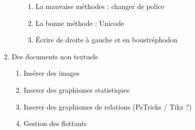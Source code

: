 \begin{enumerate}
\begin{enumerate}
\begin{enumerate}
		\begin{enumerate}
			\item La mauvaise méthodes : changer de police
			\item La bonne méthode : Unicode
			\item Écrire de droite à gauche et en boustréphodon
		\end{enumerate}
		\end{enumerate}
	\item Des documents non textuels
		\begin{enumerate}
		\item Insérer des images
		\item Inserer des graphismes statistiques
		\item Inserer des graphismes de relations (PsTricks / Tikz ?)
		\item Gestion des flottants
		\end{enumerate}
\end{enumerate}


\end{enumerate}
